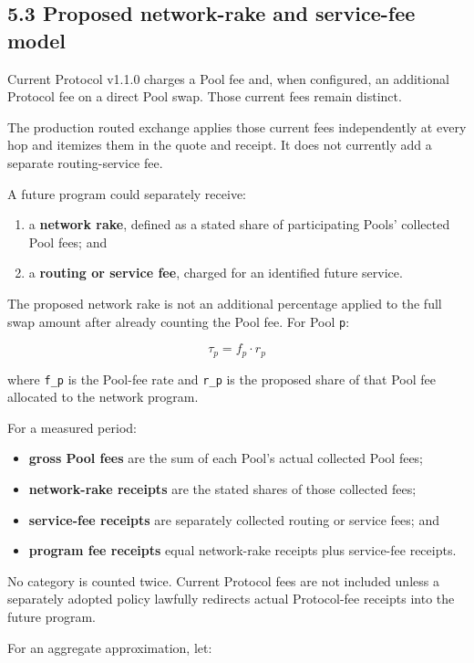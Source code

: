 \documentclass[11pt]{article}
\begin{document}
\subsection*{5.3 Proposed network-rake and service-fee model}

Current Protocol v1.1.0 charges a Pool fee and, when configured, an additional Protocol fee on a direct Pool swap. Those current fees remain distinct.

The production routed exchange applies those current fees independently at every hop and itemizes them in the quote and receipt. It does not currently add a separate routing-service fee.

A future program could separately receive:

\begin{enumerate}[leftmargin=*]
\item a \textbf{network rake}, defined as a stated share of participating Pools' collected Pool fees; and
\item a \textbf{routing or service fee}, charged for an identified future service.
\end{enumerate}
The proposed network rake is not an additional percentage applied to the full swap amount after already counting the Pool fee. For Pool \texttt{p}:

\[
\tau_p = f_p \cdot r_p
\]

where \texttt{f\_p} is the Pool-fee rate and \texttt{r\_p} is the proposed share of that Pool fee allocated to the network program.

For a measured period:

\begin{itemize}[leftmargin=*]
\item \textbf{gross Pool fees} are the sum of each Pool's actual collected Pool fees;
\item \textbf{network-rake receipts} are the stated shares of those collected fees;
\item \textbf{service-fee receipts} are separately collected routing or service fees; and
\item \textbf{program fee receipts} equal network-rake receipts plus service-fee receipts.
\end{itemize}
No category is counted twice. Current Protocol fees are not included unless a separately adopted policy lawfully redirects actual Protocol-fee receipts into the future program.

For an aggregate approximation, let:
\end{document}
